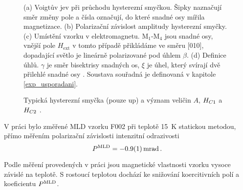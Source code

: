 \begin{figure}[htbp]\centering
{}
	\caption{(a) Voigtův jev při průchodu hysterezní smyčkou. Šipky naznačují směr změny pole a čísla označují, do které snadné osy mířila magnetizace. (b) Polarizační závislost amplitudy hysterezní smyčky.
		(c) Umístění vzorku v elektromagnetu. M$_1$-M$_4$ jsou snadné osy, vnější pole $H_\text{ext}$ v tomto případě přikládáme ve směru [010], dopadající světlo je lineárně polarizované pod úhlem $\beta$. (d) Definice úhlů. $\gamma$ je směr bisektrisy snadných os, $\xi$ je úhel, který svírají dvě přilehlé snadné osy \cite{Tesarova}. Soustava souřadná je definovaná v kapitole \ref{exp_usporadani}.}\label{revsci_mld}
\end{figure}

\begin{figure}[htbp]\centering
	\caption{Typická hysterezní smyčka (pouze up) a význam veličin $A$, $\hcj$ a $\hcd$ \cite{Reichlova}.}\label{charakterizace_hystereznismycky}
\end{figure}

V práci \cite{Reichlova} bylo změřené MLD vzorku F002 při teplotě \SI{15}{\kelvin} statickou metodou, přímo měřením polarizační závislosti intenzitní odrazivosti 
\begin{equation}
\pmld=\SI{-0,9(1)}{\milli\radian} \,.
\end{equation}

Podle měření provedených v práci \cite{Reichlova} jsou magnetické vlastnosti vzorku vysoce závislé na teplotě. S rostoucí teplotou dochází ke snižování koercitivních polí a koeficientu $\pmld$.